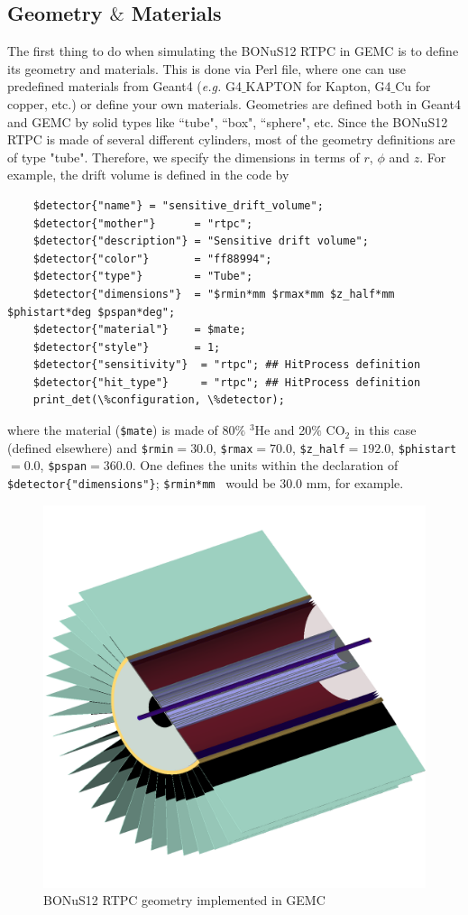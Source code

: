 \subsection{Geometry $\&$ Materials}
The first thing to do when simulating the BONuS12 RTPC in GEMC is to define its geometry and materials. This is done via Perl file, where one can use predefined materials from Geant4 (\textit{e.g.} G4$\_$KAPTON for Kapton, G4$\_$Cu for copper, etc.) or define your own materials. Geometries are defined both in Geant4 and GEMC by solid types like ``tube", ``box", ``sphere", etc. Since the BONuS12 RTPC is made of several different cylinders, most of the geometry definitions are of type "tube". Therefore, we specify the dimensions in terms of $r$, $\phi$ and $z$. For example, the drift volume is defined in the code by
\begin{lstlisting}
	$detector{"name"} = "sensitive_drift_volume";	
	$detector{"mother"}      = "rtpc";
	$detector{"description"} = "Sensitive drift volume";
	$detector{"color"}       = "ff88994";
	$detector{"type"}        = "Tube";
	$detector{"dimensions"}  = "$rmin*mm $rmax*mm $z_half*mm $phistart*deg $pspan*deg";
	$detector{"material"}    = $mate;
	$detector{"style"}       = 1;
	$detector{"sensitivity"}  = "rtpc"; ## HitProcess definition
	$detector{"hit_type"}     = "rtpc"; ## HitProcess definition
	print_det(\%configuration, \%detector);
\end{lstlisting}
where the material (\lstinline|$mate|) is made of 80$\%$ $^3$He and 20$\%$ CO$_2$ in this case (defined elsewhere) and \lstinline|$rmin|$=30.0$, \lstinline|$rmax|$=70.0$, \lstinline|$z_half|$=192.0$, \lstinline|$phistart|$=0.0$, \lstinline|$pspan|$=360.0$. One defines the units within the declaration of \lstinline|$detector{"dimensions"}|;  \lstinline|$rmin*mm | would be $30.0$ mm, for example.
\begin{figure}[h!]
	\centering
	\includegraphics[width=0.8\linewidth]{figures/rtpc.png}
	\caption{BONuS12 RTPC geometry implemented in GEMC}
	\label{fig:gemc_rtpc}
\end{figure}
